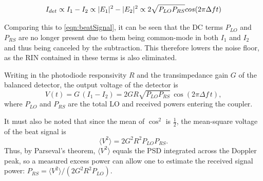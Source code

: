 \begin{equation}
	I_{det} \propto I_1 - I_2 \propto |E_1|^2 - |E_2|^2 \newline
	\propto 2\sqrt{P_{LO}P_{RS}} cos(2\pi\Delta f t)
\end{equation}

Comparing this to \autoref{eqn:beatSignal}, it can be seen that the DC terms $P_{LO}$ and $P_{RS}$ are no longer present due to them being common-mode in both $I_1$ and $I_2$ and thus being canceled by the subtraction. This therefore lowers the noise floor, as the RIN contained in these terms is also eliminated.

Writing in the photodiode responsivity $R$ and the transimpedance gain $G$ of
the balanced detector, the output voltage of the detector is
\begin{equation}
	V(t) = G\,(I_1 - I_2) = 2GR\sqrt{P_{LO}P_{RS}}\,\cos(2\pi\Delta f\,t),
	\label{eq:beat_voltage}
\end{equation}
where $P_{LO}$ and $P_{RS}$ are the total LO and received powers entering the
coupler.

It must also be noted that since the mean of $\cos^2$ is $\tfrac{1}{2}$, the mean-square voltage of the beat signal is
\begin{equation}
	\langle V^2 \rangle = 2G^2R^2P_{LO}P_{RS}.
	\label{eq:beat_power}
\end{equation}
Thus, by Parseval's theorem, $\langle V^2 \rangle$ equals the PSD integrated across
the Doppler peak, so a measured excess power can allow one to estimate the received signal power:
$P_{RS} = \langle V^2 \rangle / (2G^2R^2P_{LO})$.


